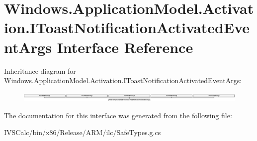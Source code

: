 \hypertarget{interface_windows_1_1_application_model_1_1_activation_1_1_i_toast_notification_activated_event_args}{}\section{Windows.\+Application\+Model.\+Activation.\+I\+Toast\+Notification\+Activated\+Event\+Args Interface Reference}
\label{interface_windows_1_1_application_model_1_1_activation_1_1_i_toast_notification_activated_event_args}
Inheritance diagram for Windows.\+Application\+Model.\+Activation.\+I\+Toast\+Notification\+Activated\+Event\+Args\+:\begin{figure}[H]
\begin{center}
\leavevmode
\includegraphics[height=0.504505cm]{interface_windows_1_1_application_model_1_1_activation_1_1_i_toast_notification_activated_event_args}
\end{center}
\end{figure}


The documentation for this interface was generated from the following file\+:\begin{DoxyCompactItemize}
\item 
I\+V\+S\+Calc/bin/x86/\+Release/\+A\+R\+M/ilc/Safe\+Types.\+g.\+cs\end{DoxyCompactItemize}

